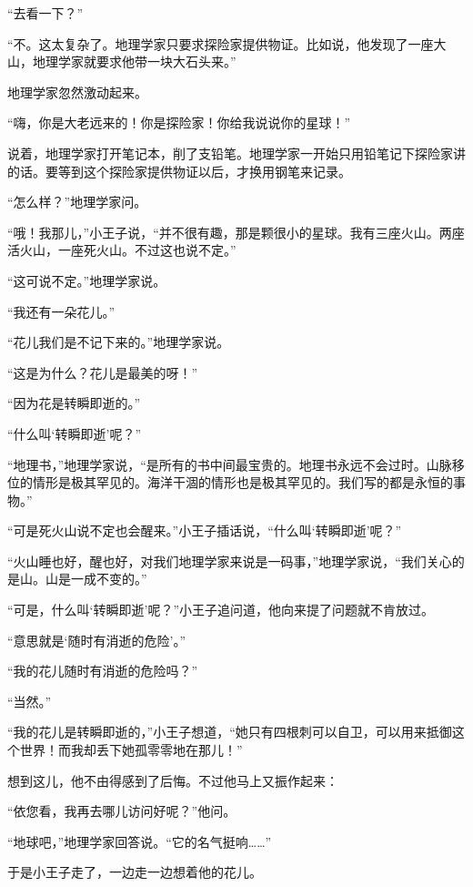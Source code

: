 “去看一下？”

“不。这太复杂了。地理学家只要求探险家提供物证。比如说，他发现了一座大山，地理学家就要求他带一块大石头来。”

地理学家忽然激动起来。

“嗨，你是大老远来的！你是探险家！你给我说说你的星球！”

说着，地理学家打开笔记本，削了支铅笔。地理学家一开始只用铅笔记下探险家讲的话。要等到这个探险家提供物证以后，才换用钢笔来记录。

“怎么样？”地理学家问。

“哦！我那儿，”小王子说，“并不很有趣，那是颗很小的星球。我有三座火山。两座活火山，一座死火山。不过这也说不定。”

“这可说不定。”地理学家说。

“我还有一朵花儿。”

“花儿我们是不记下来的。”地理学家说。

“这是为什么？花儿是最美的呀！”

“因为花是转瞬即逝的。”

“什么叫‘转瞬即逝'呢？”

“地理书，”地理学家说，“是所有的书中间最宝贵的。地理书永远不会过时。山脉移位的情形是极其罕见的。海洋干涸的情形也是极其罕见的。我们写的都是永恒的事物。”

“可是死火山说不定也会醒来。”小王子插话说，“什么叫‘转瞬即逝'呢？”

“火山睡也好，醒也好，对我们地理学家来说是一码事，”地理学家说，“我们关心的是山。山是一成不变的。”

{\startalignment[center]
 \stopalignment}

“可是，什么叫‘转瞬即逝'呢？”小王子追问道，他向来提了问题就不肯放过。

“意思就是‘随时有消逝的危险'。”

“我的花儿随时有消逝的危险吗？”

“当然。”

“我的花儿是转瞬即逝的，”小王子想道，“她只有四根刺可以自卫，可以用来抵御这个世界！而我却丢下她孤零零地在那儿！”

想到这儿，他不由得感到了后悔。不过他马上又振作起来：

“依您看，我再去哪儿访问好呢？”他问。

“地球吧，”地理学家回答说。“它的名气挺响\ldots{}\ldots{}”

于是小王子走了，一边走一边想着他的花儿。


